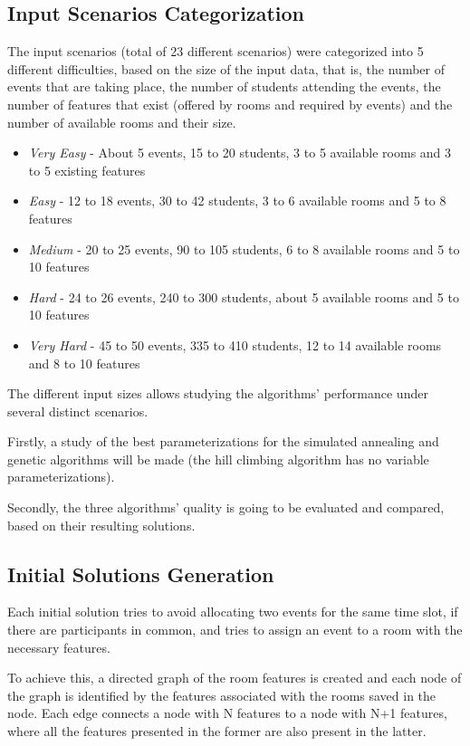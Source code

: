\documentclass[conference]{IEEEtran}
\begin{document}
\subsection{Input Scenarios Categorization}

The input scenarios (total of 23 different scenarios) were categorized into 5 different difficulties, based on the size of the input data, that is, the number of events that are taking place, the number of students attending the events, the number of features that exist (offered by rooms and required by events) and the number of available rooms and their size.

\begin{itemize}
    \item \textit{Very Easy} - About 5 events, 15 to 20 students, 3 to 5 available rooms and 3 to 5 existing features 
    \item \textit{Easy} - 12 to 18 events, 30 to 42 students, 3 to 6 available rooms and 5 to 8 features 
    \item \textit{Medium} - 20 to 25 events, 90 to 105 students, 6 to 8 available rooms and 5 to 10 features
    \item \textit{Hard} - 24 to 26 events, 240 to 300 students, about 5 available rooms and 5 to 10 features
    \item \textit{Very Hard} - 45 to 50 events, 335 to 410 students, 12 to 14 available rooms and 8 to 10 features
\end{itemize}

The different input sizes allows studying the algorithms' performance under several distinct scenarios.

Firstly, a study of the best parameterizations for the simulated annealing and genetic algorithms will be made (the hill climbing algorithm has no variable parameterizations).

Secondly, the three algorithms' quality is going to be evaluated and compared, based on their resulting solutions.

\subsection{Initial Solutions Generation} \label{subsec:isg}

Each initial solution tries to avoid allocating two events for the same time slot, if there are participants in common, and tries to assign an event to a room with the necessary features.

To achieve this, a directed graph of the room features is created and each node of the graph is identified by the features associated with the rooms saved in the node. Each edge connects a node with N features to a node with N+1 features, where all the features presented in the former are also present in the latter.
\end{document}
